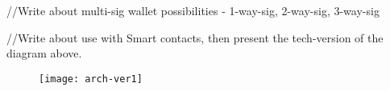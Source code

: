 //Write about multi-sig wallet possibilities - 1-way-sig, 2-way-sig, 3-way-sig

//Write about use with Smart contacts, then present the tech-version of the diagram above.











\begin{figure}[ht]
    \centering
    \texttt{[image: arch-ver1]}
    \caption{}
    \label{fig:arch-verx}
\end{figure}
